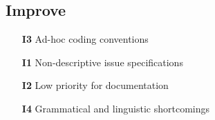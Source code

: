 \documentclass{article}
\begin{document}
\subsection*{Improve}
\begin{itemize}
  \item[\textbf{I3}] Ad-hoc coding conventions
  \item[\textbf{I1}] Non-descriptive issue specifications
  \item[\textbf{I2}] Low priority for documentation
  \item[\textbf{I4}] Grammatical and linguistic shortcomings
\end{itemize}
\end{document}
